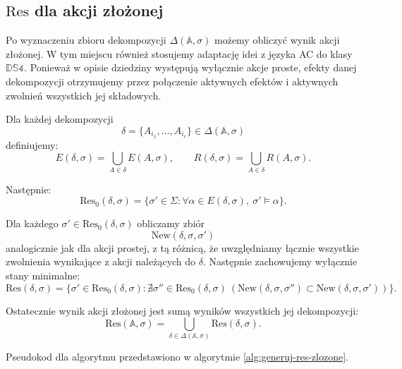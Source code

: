 \documentclass[11pt,a4paper]{article}
\theoremstyle{definition}
\begin{document}
\subsection{\texorpdfstring{$\mathrm{Res}$}{Res} dla akcji złożonej}

Po wyznaczeniu zbioru dekompozycji $\Delta(\mathbb{A},\sigma)$ możemy obliczyć wynik akcji złożonej. W tym miejscu również stosujemy adaptację idei z języka AC do klasy $\mathbb{DS4}$. Ponieważ w opisie dziedziny występują wyłącznie akcje proste, efekty danej dekompozycji otrzymujemy przez połączenie aktywnych efektów i aktywnych zwolnień wszystkich jej składowych.

Dla każdej dekompozycji
\[
\delta = \{A_{i_1},\ldots,A_{i_r}\} \in \Delta(\mathbb{A},\sigma)
\]
definiujemy:
\[
E(\delta,\sigma)=\bigcup_{A \in \delta} E(A,\sigma),
\qquad
R(\delta,\sigma)=\bigcup_{A \in \delta} R(A,\sigma).
\]

Następnie:
\[
\mathrm{Res}_0(\delta,\sigma)=\{\sigma' \in \Sigma : \forall \alpha \in E(\delta,\sigma),\ \sigma' \models \alpha\}.
\]

Dla każdego $\sigma' \in \mathrm{Res}_0(\delta,\sigma)$ obliczamy zbiór
\[
\mathrm{New}(\delta,\sigma,\sigma')
\]
analogicznie jak dla akcji prostej, z tą różnicą, że uwzględniamy łącznie wszystkie zwolnienia wynikające z akcji należących do $\delta$. Następnie zachowujemy wyłącznie stany minimalne:
\[
\mathrm{Res}(\delta,\sigma)=
\{\sigma' \in \mathrm{Res}_0(\delta,\sigma) :
\nexists \sigma'' \in \mathrm{Res}_0(\delta,\sigma)\ 
(\mathrm{New}(\delta,\sigma,\sigma'') \subset \mathrm{New}(\delta,\sigma,\sigma'))\}.
\]

Ostatecznie wynik akcji złożonej jest sumą wyników wszystkich jej dekompozycji:
\[
\mathrm{Res}(\mathbb{A},\sigma)=
\bigcup_{\delta \in \Delta(\mathbb{A},\sigma)} \mathrm{Res}(\delta,\sigma).
\]

Pseudokod dla algorytmu przedstawiono w algorytmie \ref{alg:generuj-res-zlozone}.
\end{document}
